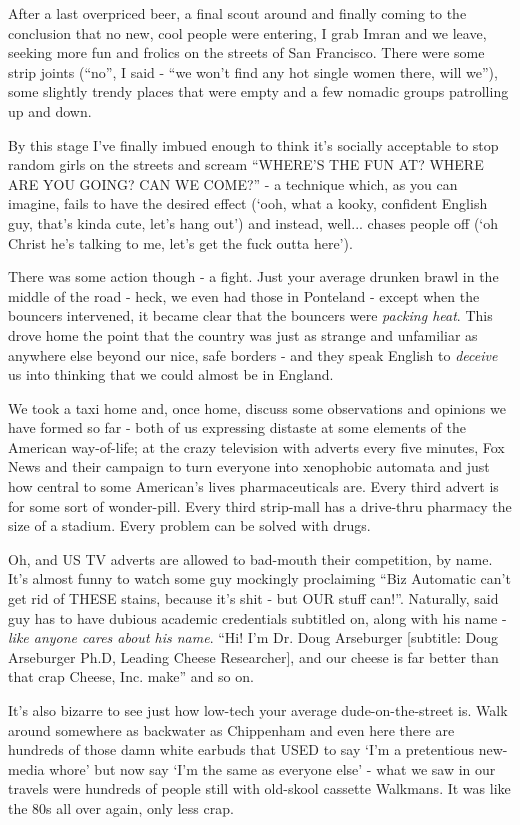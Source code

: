 \documentclass[a5paper,titlepage,11pt]{book}
\begin{document}
After a last overpriced beer, a final scout around and finally coming to the conclusion that no new, cool people were entering, I grab Imran and we leave, seeking more fun and frolics on the streets of San Francisco. There were some strip joints (``no'', I said - ``we won't find any hot single women there, will we''), some slightly trendy places that were empty and a few nomadic groups patrolling up and down.

By this stage I've finally imbued enough to think it's socially acceptable to stop random girls on the streets and scream ``WHERE'S THE FUN AT?  WHERE ARE YOU GOING?  CAN WE COME?'' - a technique which, as you can imagine, fails to have the desired effect (`ooh, what a kooky, confident English guy, that's kinda cute, let's hang out') and instead, well... chases people off (`oh Christ he's talking to me, let's get the fuck outta here').

There was some action though - a fight. Just your average drunken brawl in the middle of the road - heck, we even had those in Ponteland - except when the bouncers intervened, it became clear that the bouncers were \emph{packing heat}. This drove home the point that the country was just as strange and unfamiliar as anywhere else beyond our nice, safe borders - and they speak English to \emph{deceive} us into thinking that we could almost be in England.

We took a taxi home and, once home, discuss some observations and opinions we have formed so far - both of us expressing distaste at some elements of the American way-of-life; at the crazy television with adverts every five minutes, Fox News and their campaign to turn everyone into xenophobic automata and just how central to some American's lives pharmaceuticals are. Every third advert is for some sort of wonder-pill. Every third strip-mall has a drive-thru pharmacy the size of a stadium. Every problem can be solved with drugs.

Oh, and US TV adverts are allowed to bad-mouth their competition, by name. It's almost funny to watch some guy mockingly proclaiming ``Biz Automatic can't get rid of THESE stains, because it's shit - but OUR stuff can!''. Naturally, said guy has to have dubious academic credentials subtitled on, along with his name - \emph{like anyone cares about his name}. ``Hi! I'm Dr. Doug Arseburger [subtitle: Doug Arseburger Ph.D, Leading Cheese Researcher], and our cheese is far better than that crap Cheese, Inc. make'' and so on.

It's also bizarre to see just how low-tech your average dude-on-the-street is. Walk around somewhere as backwater as Chippenham and even here there are hundreds of those damn white earbuds that USED to say `I'm a pretentious new-media whore' but now say `I'm the same as everyone else' - what we saw in our travels were hundreds of people still with old-skool cassette Walkmans. It was like the 80s all over again, only less crap.
\end{document}
